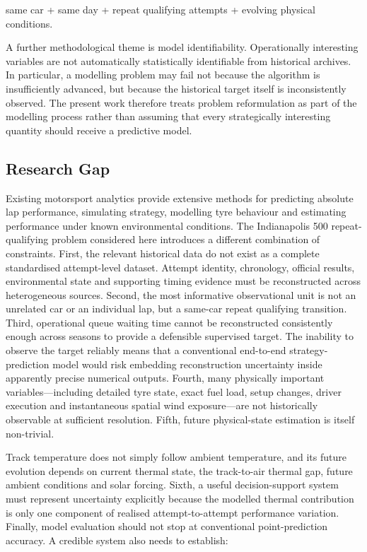 same car + same day + repeat qualifying attempts + evolving physical conditions.

A further methodological theme is model identifiability. Operationally interesting variables are not automatically statistically identifiable from historical archives. In particular, a modelling problem may fail not because the algorithm is insufficiently advanced, but because the historical target itself is inconsistently observed. The present work therefore treats problem reformulation as part of the modelling process rather than assuming that every strategically interesting quantity should receive a predictive model.

\subsection{Research Gap}
Existing motorsport analytics provide extensive methods for predicting absolute lap performance, simulating strategy, modelling tyre behaviour and estimating performance under known environmental conditions. The Indianapolis 500 repeat-qualifying problem considered here introduces a different combination of constraints. First, the relevant historical data do not exist as a complete standardised attempt-level dataset. Attempt identity, chronology, official results, environmental state and supporting timing evidence must be reconstructed across heterogeneous sources. Second, the most informative observational unit is not an unrelated car or an individual lap, but a same-car repeat qualifying transition. Third, operational queue waiting time cannot be reconstructed consistently enough across seasons to provide a defensible supervised target. The inability to observe the target reliably means that a conventional end-to-end strategy-prediction model would risk embedding reconstruction uncertainty inside apparently precise numerical outputs. Fourth, many physically important variables---including detailed tyre state, exact fuel load, setup changes, driver execution and instantaneous spatial wind exposure---are not historically observable at sufficient resolution. Fifth, future physical-state estimation is itself non-trivial.

Track temperature does not simply follow ambient temperature, and its future evolution depends on current thermal state, the track-to-air thermal gap, future ambient conditions and solar forcing. Sixth, a useful decision-support system must represent uncertainty explicitly because the modelled thermal contribution is only one component of realised attempt-to-attempt performance variation. Finally, model evaluation should not stop at conventional point-prediction accuracy. A credible system also needs to establish:

